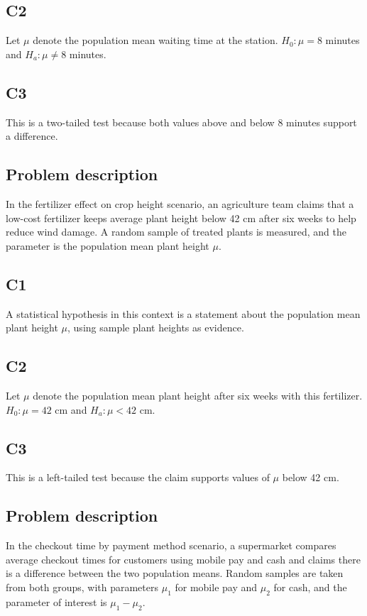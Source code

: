 \begin{ExamProblems}
		\subsection*{C2}
		Let \(\mu\) denote the population mean waiting time at the station. \(H_0\colon \mu = 8\) minutes and \(H_a\colon \mu \neq 8\) minutes.

		\subsection*{C3}
		This is a two-tailed test because both values above and below 8 minutes support a difference.

		\item
		\subsection*{Problem description}
		In the fertilizer effect on crop height scenario, an agriculture team claims that a low-cost fertilizer keeps average plant height below 42 cm after six weeks to help reduce wind damage. A random sample of treated plants is measured, and the parameter is the population mean plant height \(\mu\).

		\subsection*{C1}
		A statistical hypothesis in this context is a statement about the population mean plant height \(\mu\), using sample plant heights as evidence.

		\subsection*{C2}
		Let \(\mu\) denote the population mean plant height after six weeks with this fertilizer. \(H_0\colon \mu = 42\) cm and \(H_a\colon \mu < 42\) cm.

		\subsection*{C3}
		This is a left-tailed test because the claim supports values of \(\mu\) below 42 cm.

		\item
		\subsection*{Problem description}
		In the checkout time by payment method scenario, a supermarket compares average checkout times for customers using mobile pay and cash and claims there is a difference between the two population means. Random samples are taken from both groups, with parameters \(\mu_1\) for mobile pay and \(\mu_2\) for cash, and the parameter of interest is \(\mu_1-\mu_2\).


\end{ExamProblems}
